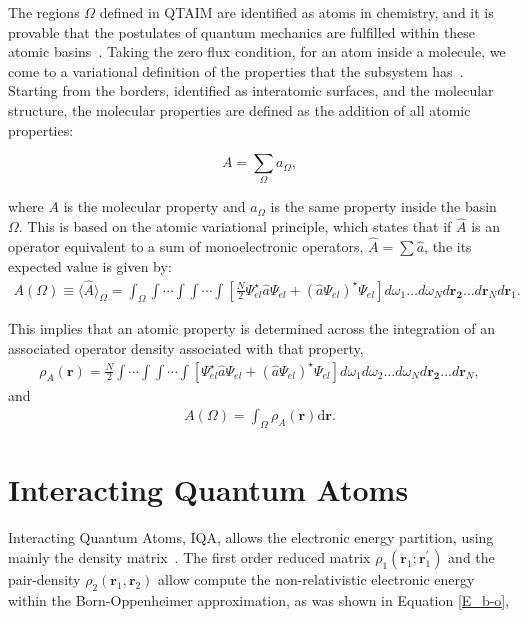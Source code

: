 The regions $\Omega$ defined in QTAIM are identified as atoms in chemistry, and
it is provable that the postulates of quantum mechanics are fulfilled within
these atomic basins~\cite{bader}. Taking the zero flux condition, for an atom
inside a molecule, we come to a variational definition of the properties that
the subsystem has~\cite{Bieglerknig1982}.  Starting from the borders,
identified as interatomic surfaces, and the molecular structure, the molecular
properties are defined as the addition of all atomic properties:

\begin{equation}
  A = \sum_{\Omega}{a_{\Omega}},
\label{promoleculares}
\end{equation}

\noindent where $A$ is the molecular property and $a_{\Omega}$ is the same
property inside the basin $\Omega$. This is based on the atomic variational
principle, which states that if $\hat{A}$ is an operator equivalent to a sum of
monoelectronic operators, $\hat{A}=\sum\hat{a}$, the its expected value is
given by:
\begin{align}
  A(\Omega) \equiv \langle\widehat{A}\rangle_{\Omega} = \int_{\Omega}\int\cdots\int\int\cdots\int
  \left [ \frac{N}{2}\Psi_{el}^{\star}\hat{a}\Psi_{el} + (\hat{a}\Psi_{el})^{\star}\Psi_{el}\right ]
  d\omega_{1}\ldots d\omega_{N}d\mathbf{r_2}\ldots d\mathbf{r}_{N}d\mathbf{r}_{1} .
\end{align}

This implies that an atomic property is determined across the integration of an
associated operator density associated with that property,
\begin{align}
  \rho_{A}(\mathbf{r})=\frac{N}{2}\int\cdots\int\int\cdots\int[
  \Psi_{el}^{\star}\hat{a}\Psi_{el} + (\hat{a}\Psi_{el})^{\star}\Psi_{el}]
  d\omega_{1}d\omega_{2}\ldots d\omega_{N}d\mathbf{r_2}\ldots d\mathbf{r}_N ,
\end{align}
and
\begin{align}
  A(\Omega)=\int_{\Omega}\rho_{A}(\mathbf{r})\mathrm{d}\mathbf{r} .
\end{align}


\section{Interacting Quantum Atoms}\label{IQAtheory}

Interacting Quantum Atoms, \gls{IQA}, allows the electronic energy partition,
using mainly the density matrix~\cite{Blanco2005, mcweeny}. The first order
reduced matrix $\rho_1(\mathbf{r}_1;\mathbf{r}_1^{\prime})$ and the
pair-density $\rho_2(\mathbf{r}_1,\mathbf{r}_2)$ allow compute the
non-relativistic electronic energy within the Born-Oppenheimer approximation,
as was shown in Equation \ref{E_b-o},

